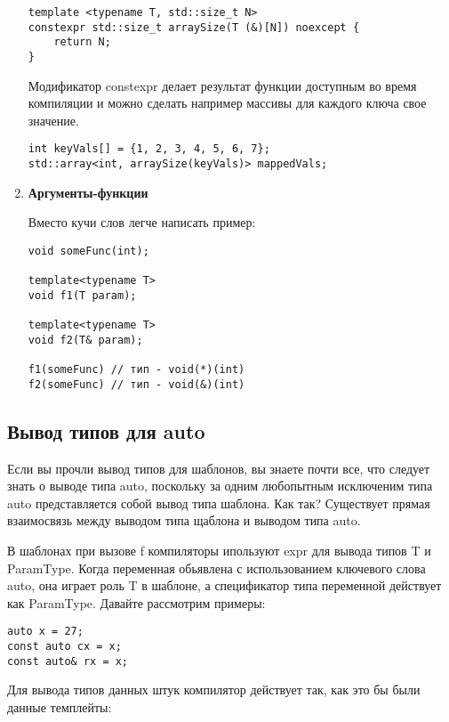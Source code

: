 \begin{enumerate}
\begin{verbatim}
template <typename T, std::size_t N>
constexpr std::size_t arraySize(T (&)[N]) noexcept {
	return N;
}
\end{verbatim}
				Модификатор constexpr делает результат функции доступным во время компиляции и можно сделать например массивы для каждого ключа свое значение.
\begin{verbatim}
int keyVals[] = {1, 2, 3, 4, 5, 6, 7};
std::array<int, arraySize(keyVals)> mappedVals;
\end{verbatim}
				
				\item \textbf{Аргументы-функции}
				
				Вместо кучи слов легче написать пример:
\begin{verbatim}
void someFunc(int);

template<typename T>
void f1(T param);

template<typename T>
void f2(T& param);

f1(someFunc) // тип - void(*)(int)
f2(someFunc) // тип - void(&)(int)
\end{verbatim}
\end{enumerate}
	
	\subsection{Вывод типов для auto}
	Если вы прочли вывод типов для шаблонов, вы знаете почти все, что следует знать о выводе типа auto, поскольку за одним любопытным исключеним типа auto представляется собой вывод типа шаблона. Как так? Существует прямая взаимосвязь между выводом типа щаблона и выводом типа auto.
	
	В шаблонах при вызове f компиляторы ипользуют expr для вывода типов T и ParamType. Когда переменная обьявлена с использованием ключевого слова auto, она играет роль T в шаблоне, а спецификатор типа переменной действует как ParamType.
	Давайте рассмотрим примеры:
\begin{verbatim}
auto x = 27;
const auto cx = x;
const auto& rx = x;
\end{verbatim}

	Для вывода типов данных штук компилятор действует так, как это бы были данные темплейты:
	
